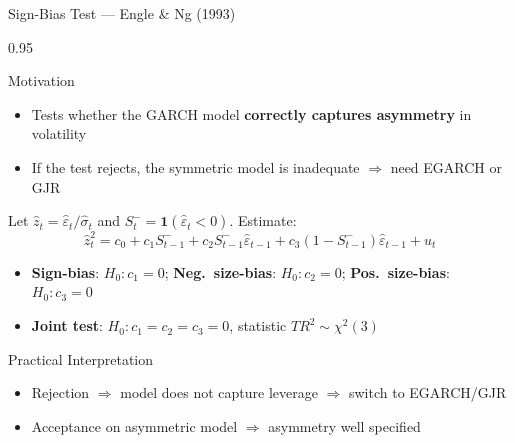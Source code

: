 \documentclass[9pt, aspectratio=169, t]{beamer}
\begin{document}
\begin{frame}{Sign-Bias Test --- Engle \& Ng (1993)}
    \begin{cminipage}{0.95\textwidth}
    {\footnotesize
    \begin{block}{Motivation}
        \begin{itemize}\setlength{\itemsep}{0pt}
            \item Tests whether the GARCH model \textbf{correctly captures asymmetry} in volatility
            \item If the test rejects, the symmetric model is inadequate $\Rightarrow$ need EGARCH or GJR
        \end{itemize}
    \end{block}
    \vspace{-1mm}
    \begin{defn}
        Let $\hat{z}_t = \hat{\varepsilon}_t / \hat{\sigma}_t$ and $S_t^- = \mathbf{1}(\hat{\varepsilon}_t < 0)$. Estimate:
        \vspace{-2mm}
        \[
            \hat{z}_t^2 = c_0 + c_1 S_{t-1}^- + c_2 S_{t-1}^- \hat{\varepsilon}_{t-1} + c_3 (1 - S_{t-1}^-) \hat{\varepsilon}_{t-1} + u_t
        \]
        \vspace{-2mm}
        \begin{itemize}\setlength{\itemsep}{-1pt}
            \item \textbf{Sign-bias}: $H_0: c_1 = 0$; \; \textbf{Neg.\ size-bias}: $H_0: c_2 = 0$; \; \textbf{Pos.\ size-bias}: $H_0: c_3 = 0$
            \item \textbf{Joint test}: $H_0: c_1 = c_2 = c_3 = 0$, statistic $TR^2 \sim \chi^2(3)$
        \end{itemize}
    \end{defn}
    \vspace{-1mm}
    \begin{alertblock}{Practical Interpretation}
        \begin{itemize}\setlength{\itemsep}{0pt}
            \item Rejection $\Rightarrow$ model does not capture leverage $\Rightarrow$ switch to EGARCH/GJR
            \item Acceptance on asymmetric model $\Rightarrow$ asymmetry well specified
        \end{itemize}
    \end{alertblock}
    }
    \end{cminipage}
\end{frame}
\end{document}
